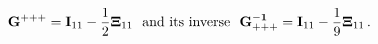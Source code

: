 \begin{equation}
\label{Mmetric} {\bf G^{+++}}={\bf I}_{11} -
\frac{1}{2}{\bf\Xi}_{11}~~{\rm and \ its\  inverse }~~ {\bf G^{-1}_{ +++}}={\bf
I}_{11} -
\frac{1}{9}{\bf\Xi}_{11}\, .
\end{equation}

